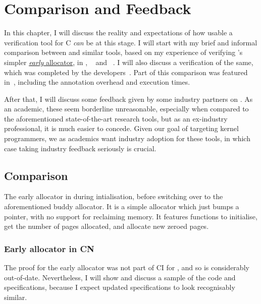 \chapter{ Comparison and Feedback}

\margintoc{}

In this chapter, I will discuss the reality and expectations of how usable a
verification tool for C \emph{can} be at this stage. I will start with my brief
and informal comparison between  and similar tools, based on my
experience of verifying 's simpler
\href{https://github.com/rems-project/CN-pKVM-early-allocator-case-study}{\emph{early}
allocator}, in , ~\cite{jacobs2011verifast} and
~\cite{baudin2021dogged}. I will also discuss a
 verification of the same, which was completed by the
developers~\cite{sammler2021refinedc}. Part of this comparison was featured
in~\textcite{pulte2023cn}, including the annotation overhead and execution
times.

After that, I will discuss some feedback given by some industry partners on
. As an academic, these seem borderline unreasonable, especially when
compared to the aforementioned state-of-the-art research tools, but as an
ex-industry professional, it is much easier to concede. Given our goal of
targeting kernel programmers, we as academics want industry adoption for these
tools, in which case taking industry feedback seriously is crucial.

\section{Comparison}

The early allocator in  during intialisation, before switching over to
the aforementioned buddy allocator. It is a simple allocator which just bumps a
pointer, with no support for reclaiming memory. It features functions to
initialise, get the number of pages allocated, and allocate new zeroed pages.

\subsection{Early allocator in CN}

The proof for the early allocator was not part of CI for , and so is
considerably out-of-date. Nevertheless, I will show and discuss a sample
of the code and specifications, because I expect updated specifications
to look recognisably similar.

